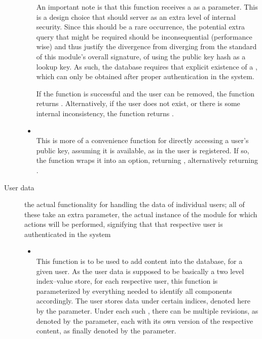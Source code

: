 \begin{description}
\begin{itemize}
  An important note is that this function receives a  as a parameter.
  This is a design choice that should server as an extra level of internal security.
  Since this should be a rare occurrence, the potential extra query that might be required should be inconsequential (performance wise) and thus justify the divergence from diverging from the standard of this module's overall signature, of using the public key hash as a lookup key.
  As such, the database requires that explicit existence of a , which can only be obtained after proper authentication in the system.

  If the function is successful and the user can be removed, the function returns .
  Alternatively, if the user does not exist, or there is some internal inconsistency, the function returns .

  \item {} \\
  This is more of a convenience function for directly accessing a user's public key, assuming it is available, as in the user is registered.
  If so, the function wraps it into an option, returning , alternatively returning .
  \end{itemize}
  \item[User data] the actual functionality for handling the data of individual users; all of these take an extra parameter, the actual instance of the  module for which actions will be performed, signifying that that respective user is authenticated in the system
  \begin{itemize}
  \item {} \\
  This function is to be used to add content into the database, for a given user.
  As the user data is supposed to be basically a two level index--value store, for each respective user, this function is parameterized by everything needed to identify all components accordingly.
  The user stores data under certain indices, denoted here by the  parameter.
  Under each such , there can be multiple revisions, as denoted by the   parameter, each with its own version of the respective content, as finally denoted by the  parameter.


\end{itemize}
\end{description}
